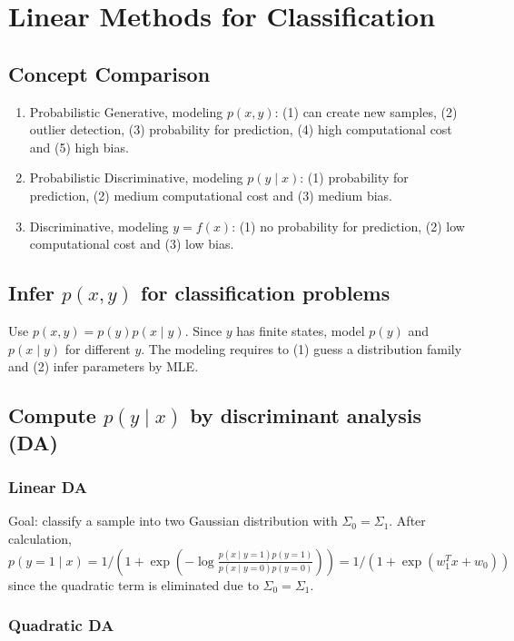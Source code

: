 \section{Linear Methods for Classification}

\subsection*{Concept Comparison}

\begin{enumerate}
    \item Probabilistic Generative, modeling $p(x, y)$: (1) can create new samples, (2) outlier detection, (3) probability for prediction, (4) high computational cost and (5) high bias.
    \item Probabilistic Discriminative, modeling $p(y\mid x)$: (1) probability for prediction, (2) medium computational cost and (3) medium bias.
    \item Discriminative, modeling $y=f(x)$: (1) no probability for prediction, (2) low computational cost and (3) low bias.
\end{enumerate}

\subsection*{Infer $p(x,y)$ for classification problems}

Use $p(x,y) = p(y)p(x\mid y)$. Since $y$ has finite states, model $p(y)$ and $p(x\mid y)$ for different $y$. The modeling requires to (1) guess a distribution family and (2) infer parameters by MLE.

\subsection*{Compute $p(y\mid x)$ by discriminant analysis (DA)}

\subsubsection*{Linear DA}

Goal: classify a sample into two Gaussian distribution with $\Sigma_0 = \Sigma_1$.
After calculation, $p(y=1\mid x) = 1/(1+\exp(-\log\frac{p(x\mid y=1)p(y=1)}{p(x\mid y=0)p(y=0)})) = 1/(1+\exp(w_1^T x +w_0))$ since the quadratic term is eliminated due to $\Sigma_0=\Sigma_1$.

\subsubsection*{Quadratic DA}

